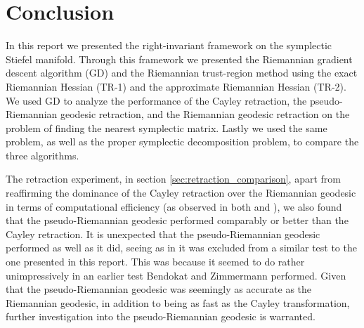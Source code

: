 \newpage
\section{Conclusion}\label{sec:Conclusion}
In this report we presented the right-invariant framework on the symplectic Stiefel manifold. Through this framework we presented the Riemannian gradient descent algorithm (GD) and the Riemannian trust-region method using the exact Riemannian Hessian (TR-1) and the approximate Riemannian Hessian (TR-2). We used GD to analyze the performance of the Cayley retraction, the pseudo-Riemannian geodesic retraction, and the Riemannian geodesic retraction on the problem of finding the nearest symplectic matrix. Lastly we used the same problem, as well as the proper symplectic decomposition problem, to compare the three algorithms. 

The retraction experiment, in section \ref{sec:retraction_comparison}, apart from reaffirming the dominance of the Cayley retraction over the Riemannian geodesic in terms of computational efficiency (as observed in both \cite[p.~8]{JensenZimmermann2024} and \cite[p.~26]{BendokatZimmermann2021}), we also found that the pseudo-Riemannian geodesic performed comparably or better than the Cayley retraction. It is unexpected that the pseudo-Riemannian geodesic performed as well as it did, seeing as in \cite[p.~28]{BendokatZimmermann2021} it was excluded from a similar test to the one presented in this report. This was because it seemed to do rather unimpressively in an earlier test Bendokat and Zimmermann performed. Given that the pseudo-Riemannian geodesic was seemingly as accurate as the Riemannian geodesic, in addition to being as fast as the Cayley transformation, further investigation into the pseudo-Riemannian geodesic is warranted. 

